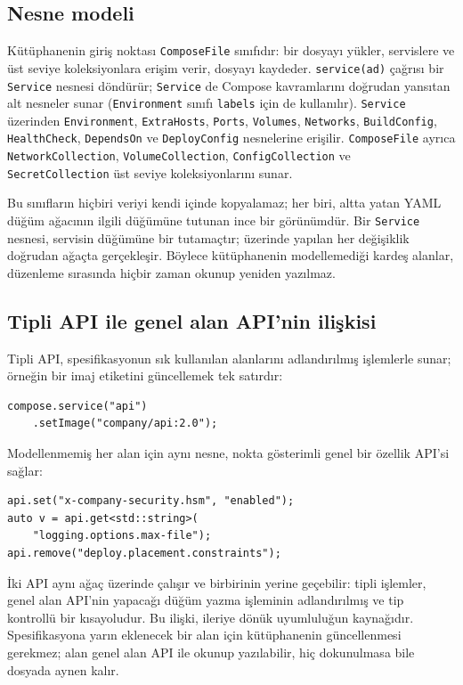 \documentclass[12pt,a4paper]{article}
\begin{document}
\subsection{Nesne modeli}
Kütüphanenin giriş noktası \texttt{ComposeFile} sınıfıdır: bir dosyayı
yükler, servislere ve üst seviye koleksiyonlara erişim verir, dosyayı
kaydeder. \texttt{service(ad)} çağrısı bir \texttt{Service} nesnesi
döndürür; \texttt{Service} de Compose kavramlarını doğrudan yansıtan alt
nesneler sunar (\texttt{Environment} sınıfı \texttt{labels} için de
kullanılır). \texttt{Service} üzerinden \texttt{Environment},
\texttt{ExtraHosts}, \texttt{Ports}, \texttt{Volumes}, \texttt{Networks},
\texttt{BuildConfig}, \texttt{HealthCheck}, \texttt{DependsOn} ve
\texttt{DeployConfig} nesnelerine erişilir. \texttt{ComposeFile} ayrıca
\texttt{NetworkCollection}, \texttt{VolumeCollection},
\texttt{ConfigCollection} ve \texttt{SecretCollection} üst seviye
koleksiyonlarını sunar.

Bu sınıfların hiçbiri veriyi kendi içinde kopyalamaz; her biri, altta yatan
YAML düğüm ağacının ilgili düğümüne tutunan ince bir görünümdür. Bir
\texttt{Service} nesnesi, servisin düğümüne bir tutamaçtır; üzerinde
yapılan her değişiklik doğrudan ağaçta gerçekleşir. Böylece kütüphanenin
modellemediği kardeş alanlar, düzenleme sırasında hiçbir zaman okunup
yeniden yazılmaz.

\subsection{Tipli API ile genel alan API'nin ilişkisi}
Tipli API, spesifikasyonun sık kullanılan alanlarını adlandırılmış
işlemlerle sunar; örneğin bir imaj etiketini güncellemek tek satırdır:

{\footnotesize
\begin{verbatim}
compose.service("api")
    .setImage("company/api:2.0");
\end{verbatim}
}

Modellenmemiş her alan için aynı nesne, nokta gösterimli genel bir özellik
API'si sağlar:

{\footnotesize
\begin{verbatim}
api.set("x-company-security.hsm", "enabled");
auto v = api.get<std::string>(
    "logging.options.max-file");
api.remove("deploy.placement.constraints");
\end{verbatim}
}

İki API aynı ağaç üzerinde çalışır ve birbirinin yerine geçebilir: tipli
işlemler, genel alan API'nin yapacağı düğüm yazma işleminin adlandırılmış ve
tip kontrollü bir kısayoludur. Bu ilişki, ileriye dönük uyumluluğun
kaynağıdır. Spesifikasyona yarın eklenecek bir alan için kütüphanenin
güncellenmesi gerekmez; alan genel alan API ile okunup yazılabilir, hiç
dokunulmasa bile dosyada aynen kalır.
\end{document}
